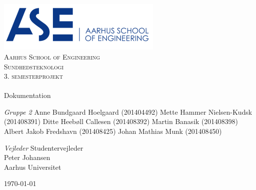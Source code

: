 \begin{titlingpage}
\begin{center}

~ \\[3cm]

\includegraphics[width=0.6\textwidth]{figurer/ASE}~\\[1cm]

\textsc{\LARGE Aarhus School of Engineering}\\[1.5cm]

\textsc{\Large Sundhedsteknologi}\\
\textsc{\Large 3. semesterprojekt}\\[0.5cm]

\noindent\makebox[\linewidth]{\rule{\textwidth}{0.4pt}}\\
[0.5cm]{\Huge Dokumentation}
\noindent\makebox[\linewidth]{\rule{\textwidth}{0.4pt}}

\end{center}

\textit{Gruppe 2} \newline
Anne Bundgaard Hoelgaard  (201404492) \newline
Mette Hammer Nielsen-Kudsk  (201408391) \newline	
Ditte Heebøll Callesen (201408392) \newline
Martin Banasik  (201408398) \newline	
Albert Jakob Fredshavn (201408425) \newline 
Johan Mathias Munk  (201408450) \newline


\textit{Vejleder} \newline
Studentervejleder\\
Peter Johansen\\
Aarhus Universitet


\vfill

\begin{center}
{\large \today}
\end{center}


\end{titlingpage}